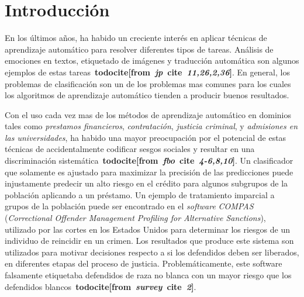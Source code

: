 \chapter*{Introducción}\label{chapter:introduction}

\newcommand{\todocite}[2]{\textbf{todocite[from~\textit{#1}~cite~\textit{#2}]}}



En los últimos años, ha habido un creciente interés en aplicar técnicas de aprendizaje automático para resolver diferentes tipos de tareas.
Análisis de emociones en textos, etiquetado de imágenes y traducción automática son algunos ejemplos de estas tareas~\todocite{jp}{11,26,2,36}.
En general, los problemas de clasificación son un de los problemas mas comunes para los cuales los algoritmos de aprendizaje automático tienden a producir buenos resultados.


Con el uso cada vez mas de los métodos de aprendizaje automático en dominios tales como \emph{prestamos financieros}, \emph{contratación}, \emph{justicia criminal}, y \emph{admisiones en las universidades}, ha habido una mayor preocupación por el potencial de estas técnicas de accidentalmente codificar sesgos sociales y resultar en una discriminación sistemática~\todocite{fbo}{4-6,8,10}.
Un clasificador que solamente es ajustado para maximizar la precisión de las predicciones puede injustamente predecir un alto riesgo en el crédito para algunos subgrupos de la población aplicando a un préstamo.
Un ejemplo de tratamiento imparcial a grupos de la población puede ser encontrado en el \emph{software} \emph{COMPAS} (\emph{Correctional Offender Management Profiling for Alternative Sanctions}), utilizado por las cortes en los Estados Unidos para determinar los riesgos de un individuo de reincidir en un crimen.
Los resultados que produce este sistema son utilizados para motivar decisiones respecto a si los defendidos deben ser liberados, en diferentes etapas del proceso de justicia.
Problemáticamente, este software falsamente etiquetaba defendidos de raza no blanca con un mayor riesgo que los defendidos blancos~\todocite{survey}{2}.


